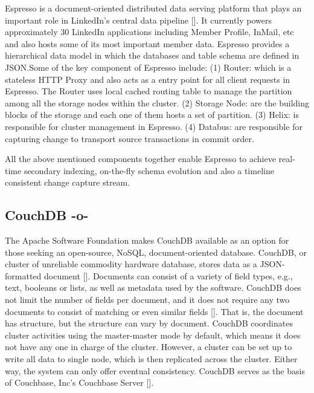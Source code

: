 Espresso is a document-oriented distributed data serving platform that
plays an important role in LinkedIn's central data pipeline
[\cite{www-Linkedin-Espresso}].  It currently powers approximately 30
LinkedIn applications including Member Profile, InMail, etc and also
hosts some of its most important member data. Espresso provides a
hierarchical data model in which the databases and table schema are
defined in JSON.Some of the key component of Espresso include: (1)
Router: which is a stateless HTTP Proxy and also acts as a entry point
for all client requests in Espresso. The Router uses local cached
routing table to manage the partition among all the storage nodes
within the cluster. (2) Storage Node: are the building blocks of the
storage and each one of them hosts a set of partition. (3) Helix: is
responsible for cluster management in Espresso. (4) Databus: are
responsible for capturing change to transport source transactions in
commit order.

All the above mentioned components together enable Espresso to achieve
real-time secondary indexing, on-the-fly schema evolution and also a
timeline consistent change capture stream.



\subsection{CouchDB -o-}
     
The Apache Software Foundation makes CouchDB available as an option
for those seeking an open-source, NoSQL, document-oriented
database. CouchDB, or cluster of unreliable commodity hardware
database, stores data as a JSON-formatted document
[\cite{www-exploringcdb-couchdb}].  Documents can consist of a variety
of field types, e.g., text, booleans or lists, as well as metadata
used by the software. CouchDB does not limit the number of fields per
document, and it does not require any two documents to consist of
matching or even similar fields
[\cite{www-techoverview-couchdb}]. That is, the document has
structure, but the structure can vary by document.  CouchDB
coordinates cluster activities using the master-master mode by
default, which means it does not have any one in charge of the
cluster.  However, a cluster can be set up to write all data to single
node, which is then replicated across the cluster.  Either way, the
system can only offer eventual consistency. CouchDB serves as the
basis of Couchbase, Inc's Couchbase Server
[\cite{www-cdb-vs-cbs-couchdb}].



